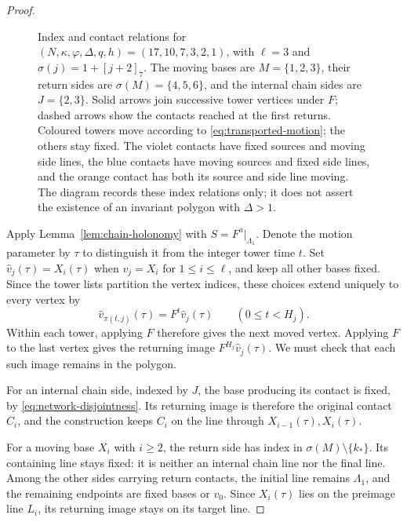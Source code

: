 \documentclass[11pt,a4paper]{article}
\theoremstyle{definition}
\theoremstyle{remark}
\numberwithin{equation}{section}
\begin{document}
\begin{proof}
\begin{figure}[htbp]
\caption{Index and contact relations for $(N,\kappa,\varphi,\Delta,q,h)=(17,10,7,3,2,1)$, with $\ell=3$ and $\sigma(j)=1+[j+2]_7$. The moving bases are $M=\{1,2,3\}$, their return sides are $\sigma(M)=\{4,5,6\}$, and the internal chain sides are $J=\{2,3\}$. Solid arrows join successive tower vertices under $F$; dashed arrows show the contacts reached at the first returns. Coloured towers move according to \eqref{eq:transported-motion}; the others stay fixed. The violet contacts have fixed sources and moving side lines, the blue contacts have moving sources and fixed side lines, and the orange contact has both its source and side line moving. The diagram records these index relations only; it does not assert the existence of an invariant polygon with $\Delta>1$.}
\label{fig:global-motion}
\end{figure}

Apply Lemma~\ref{lem:chain-holonomy} with $S=F^a|_{\Lambda_1}$. Denote the motion parameter by $\tau$ to distinguish it from the integer tower time $t$. Set $\widehat v_j(\tau)=X_i(\tau)$ when $v_j=X_i$ for $1\le i\le\ell$, and keep all other bases fixed. Since the tower lists partition the vertex indices, these choices extend uniquely to every vertex by
\begin{equation}\label{eq:transported-motion}
 \widehat v_{\pi(t,j)}(\tau)=F^t\widehat v_j(\tau)
 \qquad(0\le t<H_j).
\end{equation}
Within each tower, applying $F$ therefore gives the next moved vertex. Applying $F$ to the last vertex gives the returning image $F^{H_j}\widehat v_j(\tau)$. We must check that each such image remains in the polygon.

For an internal chain side, indexed by $J$, the base producing its contact is fixed, by \eqref{eq:network-disjointness}. Its returning image is therefore the original contact $C_i$, and the construction keeps $C_i$ on the line through $X_{i-1}(\tau),X_i(\tau)$.

For a moving base $X_i$ with $i\ge2$, the return side has index in $\sigma(M)\setminus\{k_*\}$. Its containing line stays fixed: it is neither an internal chain line nor the final line. Among the other sides carrying return contacts, the initial line remains $\Lambda_1$, and the remaining endpoints are fixed bases or $v_0$. Since $X_i(\tau)$ lies on the preimage line $L_i$, its returning image stays on its target line.


\end{proof}
\end{document}
